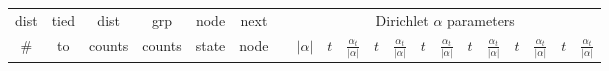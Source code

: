 \renewcommand{\baselinestretch}{1.0}
\begin{table}
\renewcommand{\tabcolsep}{0.7em}
\tiny
\begin{center}
\begin{tabular}{|rr|rr|cc|c|c|cc|cc|cc|cc|cc|cc|} \cline{1-6} \cline{8-20}
\multicolumn{1}{|c}{dist} & \multicolumn{1}{c|}{tied} &
  \multicolumn{1}{c}{dist} & \multicolumn{1}{c|}{grp} & node & next &
  & \multicolumn{13}{|c|}{Dirichlet $\alpha$ parameters} \\ %
\multicolumn{1}{|c}{\#} & \multicolumn{1}{c|}{to} & \multicolumn{1}{c}{counts} & \multicolumn{1}{c|}{counts} & state & node & & $|\alpha|$ & $t$ &
  $\frac{\alpha_{t}}{|\alpha|}$ & $t$ & $\frac{\alpha_{t}}{|\alpha|}$ & $t$ &
  $\frac{\alpha_{t}}{|\alpha|}$ & $t$ & $\frac{\alpha_{t}}{|\alpha|}$ & $t$ &
  $\frac{\alpha_{t}}{|\alpha|}$ & $t$ & $\frac{\alpha_{t}}{|\alpha|}$ \\
  \cline{1-6} \cline {8-20} 


\end{tabular}
\end{center}
\end{table}
